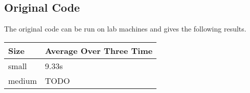 \subsection*{Original Code}
The original code can be run on lab machines and gives the following results.\\
\begin{tabular}{ l | l }
  \hline
  Size & Average Over Three Time \\
  \hline
  \hline
  small & 9.33s \\
  medium & TODO \\
  \hline
\end{tabular}
